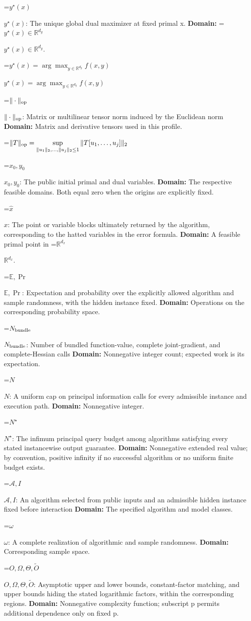 \documentclass[10pt,a4paper]{article}
\newcommand{\AtlasMath}[1]{\par\begingroup\centering\setbox0=\hbox{$\displaystyle #1$}\ifdim\wd0>1.4\linewidth\typeout{ATLAS WIDE FORMULA: \the\wd0}\fi\ifdim\wd0>\linewidth\resizebox{\linewidth}{!}{\box0}\else\box0\fi\par\endgroup}
\newcommand{\AtlasInlineMath}[1]{\begingroup\setbox0=\hbox{$#1$}\ifdim\wd0>.4\linewidth\endgroup\AtlasMath{#1}\else\endgroup$#1$\fi}
\begin{document}
\AtlasInlineMath{y^\star(x)}: The unique global dual maximizer at fixed primal x. \textbf{Domain:} \AtlasInlineMath{y^\star(x)\in\mathbb R^{d_y}}.

\AtlasInlineMath{y^\star(x)=\arg\max_{y\in\mathbb R^{d_y}}f(x,y)}

\AtlasInlineMath{\|\cdot\|_{\rm op}}: Matrix or multilinear tensor norm induced by the Euclidean norm \textbf{Domain:} Matrix and derivative tensors used in this profile.


\AtlasMath{\|T\|_{\rm op}=\sup_{\|u_1\|_2,\ldots,\|u_j\|_2\le1}\|T[u_1,\ldots,u_j]\|_2}


\AtlasInlineMath{x_0,y_0}: The public initial primal and dual variables. \textbf{Domain:} The respective feasible domains. Both equal zero when the origins are explicitly fixed.

\AtlasInlineMath{\widehat x}: The point or variable blocks ultimately returned by the algorithm, corresponding to the hatted variables in the error formula. \textbf{Domain:} A feasible primal point in \AtlasInlineMath{\mathbb R^{d_x}}.

\AtlasInlineMath{\mathbb E,\Pr}: Expectation and probability over the explicitly allowed algorithm and sample randomness, with the hidden instance fixed. \textbf{Domain:} Operations on the corresponding probability space.

\AtlasInlineMath{N_{\rm bundle}}: Number of bundled function-value, complete joint-gradient, and complete-Hessian calls \textbf{Domain:} Nonnegative integer count; expected work is its expectation.

\AtlasInlineMath{N}: A uniform cap on principal information calls for every admissible instance and execution path. \textbf{Domain:} Nonnegative integer.

\AtlasInlineMath{N^\star}: The infimum principal query budget among algorithms satisfying every stated instancewise output guarantee. \textbf{Domain:} Nonnegative extended real value; by convention, positive infinity if no successful algorithm or no uniform finite budget exists.

\AtlasInlineMath{\mathcal A,I}: An algorithm selected from public inputs and an admissible hidden instance fixed before interaction \textbf{Domain:} The specified algorithm and model classes.

\AtlasInlineMath{\omega}: A complete realization of algorithmic and sample randomness. \textbf{Domain:} Corresponding sample space.

\AtlasInlineMath{O,\Omega,\Theta,\widetilde O}: Asymptotic upper and lower bounds, constant-factor matching, and upper bounds hiding the stated logarithmic factors, within the corresponding regions. \textbf{Domain:} Nonnegative complexity function; subscript p permits additional dependence only on fixed p.
\end{document}
